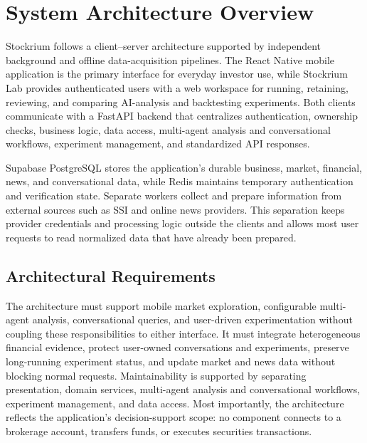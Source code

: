 \section{System Architecture Overview}
\label{sec:system-architecture-overview}

Stockrium follows a client--server architecture supported by independent background and offline data-acquisition pipelines. The React Native mobile application is the primary interface for everyday investor use, while Stockrium Lab provides authenticated users with a web workspace for running, retaining, reviewing, and comparing AI-analysis and backtesting experiments. Both clients communicate with a FastAPI backend that centralizes authentication, ownership checks, business logic, data access, multi-agent analysis and conversational workflows, experiment management, and standardized API responses.

Supabase PostgreSQL stores the application's durable business, market, financial, news, and conversational data, while Redis maintains temporary authentication and verification state. Separate workers collect and prepare information from external sources such as SSI and online news providers. This separation keeps provider credentials and processing logic outside the clients and allows most user requests to read normalized data that have already been prepared.

\subsection{Architectural Requirements}
\label{subsec:architectural-requirements}

The architecture must support mobile market exploration, configurable multi-agent analysis, conversational queries, and user-driven experimentation without coupling these responsibilities to either interface. It must integrate heterogeneous financial evidence, protect user-owned conversations and experiments, preserve long-running experiment status, and update market and news data without blocking normal requests. Maintainability is supported by separating presentation, domain services, multi-agent analysis and conversational workflows, experiment management, and data access. Most importantly, the architecture reflects the application's decision-support scope: no component connects to a brokerage account, transfers funds, or executes securities transactions.

